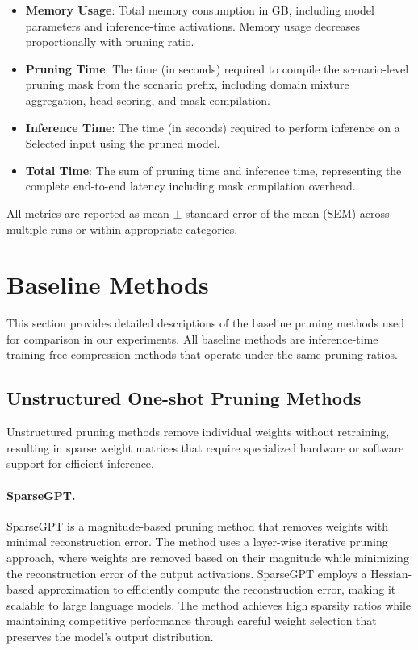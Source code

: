 \begin{itemize}
    \item \textbf{Memory Usage}: Total memory consumption in GB, including model parameters and inference-time activations. Memory usage decreases proportionally with pruning ratio.
    
    \item \textbf{Pruning Time}: The time (in seconds) required to compile the scenario-level pruning mask from the scenario prefix, including domain mixture aggregation, head scoring, and mask compilation.
    
    \item \textbf{Inference Time}: The time (in seconds) required to perform inference on a Selected input using the pruned model.
    
    \item \textbf{Total Time}: The sum of pruning time and inference time, representing the complete end-to-end latency including mask compilation overhead.
    
\end{itemize}


All metrics are reported as mean $\pm$ standard error of the mean (SEM) across multiple runs or within appropriate categories.

\section{Baseline Methods}
\label{app:baseline_methods}

This section provides detailed descriptions of the baseline pruning methods used for comparison in our experiments. All baseline methods are inference-time training-free compression methods that operate under the same pruning ratios.

\subsection{Unstructured One-shot Pruning Methods}

Unstructured pruning methods remove individual weights without retraining, resulting in sparse weight matrices that require specialized hardware or software support for efficient inference.

\paragraph{SparseGPT.}
SparseGPT \cite{frantar2023sparsegpt} is a magnitude-based pruning method that removes weights with minimal reconstruction error. The method uses a layer-wise iterative pruning approach, where weights are removed based on their magnitude while minimizing the reconstruction error of the output activations. SparseGPT employs a Hessian-based approximation to efficiently compute the reconstruction error, making it scalable to large language models. The method achieves high sparsity ratios while maintaining competitive performance through careful weight selection that preserves the model's output distribution.

